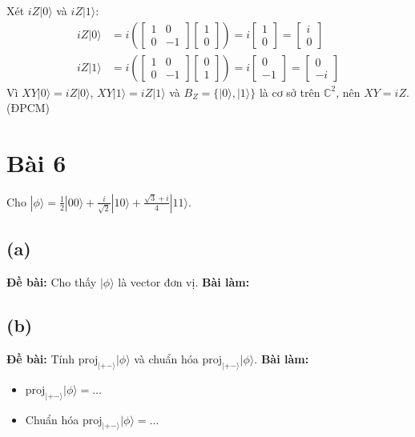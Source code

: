 Xét $iZ|0\rangle$ và $iZ|1\rangle$:
\begin{align*}
    iZ|0\rangle &= i\left(\begin{bmatrix}
        1 & 0\\
        0 & -1
    \end{bmatrix}
    \begin{bmatrix}
        1\\
        0
    \end{bmatrix}\right)
    = i\begin{bmatrix}
        1\\
        0
    \end{bmatrix}
    = \begin{bmatrix}
        i\\
        0
    \end{bmatrix}\\
    iZ|1\rangle &= i\left(\begin{bmatrix}
        1 & 0\\
        0 & -1
    \end{bmatrix}
    \begin{bmatrix}
        0\\
        1
    \end{bmatrix}\right)
    = i\begin{bmatrix}
        0\\
        -1
    \end{bmatrix}
    = \begin{bmatrix}
        0\\
        -i
    \end{bmatrix}
\end{align*}
Vì $XY|0\rangle = iZ|0\rangle$, $XY|1\rangle = iZ|1\rangle$ và $B_Z = \{|0\rangle, |1\rangle\}$ là cơ sở trên $\mathbb{C}^2$, nên $XY = iZ$. (ĐPCM)

\section{Bài 6}
Cho $|\phi\rangle=\frac{1}{2}|00\rangle+\frac{i}{\sqrt{2}}|10\rangle+\frac{\sqrt{3}+i}{4}|11\rangle$.

\subsection{(a)}
\textbf{Đề bài:} Cho thấy $|\phi\rangle$ là vector đơn vị.
\textbf{Bài làm:}

\subsection{(b)}
\textbf{Đề bài:} Tính $\mathrm{proj}_{|+-\rangle}|\phi\rangle$ và chuẩn hóa $\mathrm{proj}_{|+-\rangle}|\phi\rangle$.
\textbf{Bài làm:}
\begin{itemize}
    \item $\mathrm{proj}_{|+-\rangle}|\phi\rangle = \dots$
    \item Chuẩn hóa $\mathrm{proj}_{|+-\rangle}|\phi\rangle = \dots$
\end{itemize}

